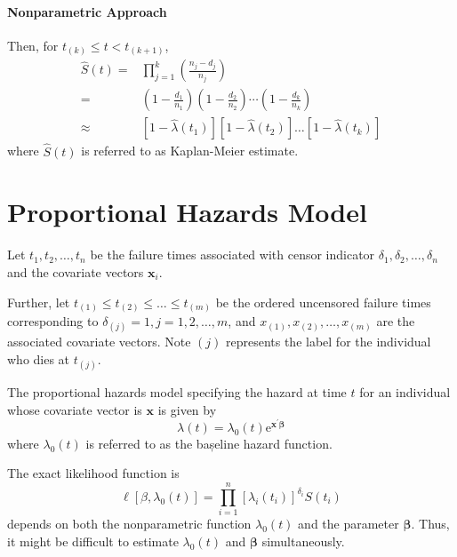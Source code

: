 \paragraph*{Nonparametric Approach}

Then, for $t_{(k)}\leq t<t_{(k+1)}$,
\begin{equation}
    \begin{aligned}
        \hat{S}(t)= & \prod_{j=1}^{k}\left(\frac{n_{j}-d_{j}}{n_{j}}\right)                                                                                             \\
        =           & \left(1-\frac{d_{1}}{n_{1}}\right)\left(1-\frac{d_{2}}{n_{2}}\right) \cdots\left(1-\frac{d_{k}}{n_{k}}\right)                                     \\
        \approx     & \left[1-\hat{\lambda}\left(t_{1}\right)\right]\left[1-\hat{\lambda}\left(t_{2}\right)\right] \ldots\left[1-\hat{\lambda}\left(t_{k}\right)\right]
    \end{aligned}
\end{equation}
where $\hat{S}(t)$ is referred to as Kaplan-Meier estimate.

\section{Proportional Hazards Model}

Let $t_{1},t_{2},\ldots,t_{n}$ be the failure times associated with censor indicator $\delta_{1},\delta_{2},\ldots,\delta_{n}$ and the covariate vectors $\mathbf{x}_{i}$.

Further, let $t_{(1)}\leq t_{(2)}\leq\ldots\leq t_{(m)}$ be the ordered uncensored failure times corresponding to $\delta_{(j)}=1,j=1,2,\ldots,m$, and $x_{(1)},x_{(2)},\ldots,x_{(m)}$ are the associated covariate vectors. Note $(j)$ represents the label for the individual who dies at $t_{(j)}$.

The proportional hazards model specifying the hazard at time $t$ for an individual whose covariate vector is $\mathbf{x}$ is given by
\begin{equation}
    \lambda(t)=\lambda_{0}(t)\mathrm{e}^{\mathbf{x}^{\prime}\boldsymbol{\beta}}
\end{equation}
where $\lambda_{0}(t)$ is referred to as the bașeline hazard function.

The exact likelihood function is
\begin{equation}
    \ell\left[\beta,\lambda_{0}(t)\right]=\prod_{i=1}^{n}\left[\lambda_{i}\left(t_{i}\right)\right]^{\delta_{i}}S\left(t_{i}\right)
\end{equation}
depends on both the nonparametric function $\lambda_{0}(t)$ and the parameter $\boldsymbol{\beta}$. Thus, it might be difficult to estimate $\lambda_{0}(t)$ and $\boldsymbol{\beta}$ simultaneously.

